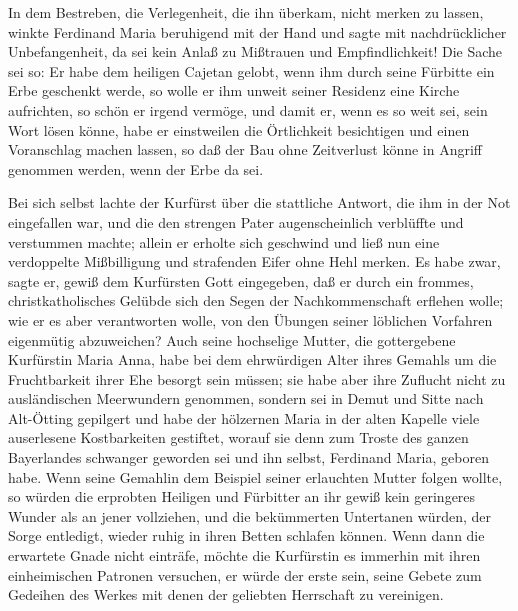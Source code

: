 In dem Bestreben, die Verlegenheit, die ihn überkam, nicht merken
zu lassen, winkte Ferdinand Maria beruhigend mit der Hand und sagte
mit nachdrücklicher Unbefangenheit, da sei kein Anlaß zu Mißtrauen
und Empfindlichkeit! Die Sache sei so: Er habe dem heiligen Cajetan
gelobt, wenn ihm durch seine Fürbitte ein Erbe geschenkt werde, so
wolle er ihm unweit seiner Residenz eine Kirche aufrichten, so
schön er irgend vermöge, und damit er, wenn es so weit sei, sein
Wort lösen könne, habe er einstweilen die Örtlichkeit besichtigen
und einen Voranschlag machen lassen, so daß der Bau ohne
Zeitverlust könne in Angriff genommen werden, wenn der Erbe da
sei.

Bei sich selbst lachte der Kurfürst über die stattliche Antwort,
die ihm in der Not eingefallen war, und die den strengen Pater
augenscheinlich verblüffte und verstummen machte; allein er erholte
sich geschwind und ließ nun eine verdoppelte Mißbilligung und
strafenden Eifer ohne Hehl merken. Es habe zwar, sagte er, gewiß
dem Kurfürsten Gott eingegeben, daß er durch ein frommes,
christkatholisches Gelübde sich den Segen der Nachkommenschaft
erflehen wolle; wie er es aber verantworten wolle, von den Übungen
seiner löblichen Vorfahren eigenmütig \pagenum{[105]} abzuweichen?
Auch seine hochselige Mutter, die gottergebene Kurfürstin Maria
Anna, habe bei dem ehrwürdigen Alter ihres Gemahls um die
Fruchtbarkeit ihrer Ehe besorgt sein müssen; sie habe aber ihre
Zuflucht nicht zu ausländischen Meerwundern genommen, sondern sei
in Demut und Sitte nach Alt-Ötting gepilgert und habe der hölzernen
Maria in der alten Kapelle viele auserlesene Kostbarkeiten
gestiftet, worauf sie denn zum Troste des ganzen Bayerlandes
schwanger geworden sei und ihn selbst, Ferdinand Maria, geboren
habe. Wenn seine Gemahlin dem Beispiel seiner erlauchten Mutter
folgen wollte, so würden die erprobten Heiligen und Fürbitter an
ihr gewiß kein geringeres Wunder als an jener vollziehen, und die
bekümmerten Untertanen würden, der Sorge entledigt, wieder ruhig in
ihren Betten schlafen können. Wenn dann die erwartete Gnade nicht
einträfe, möchte die Kurfürstin es immerhin mit ihren einheimischen
Patronen versuchen, er würde der erste sein, seine Gebete zum
Gedeihen des Werkes mit denen der geliebten Herrschaft zu
vereinigen.

